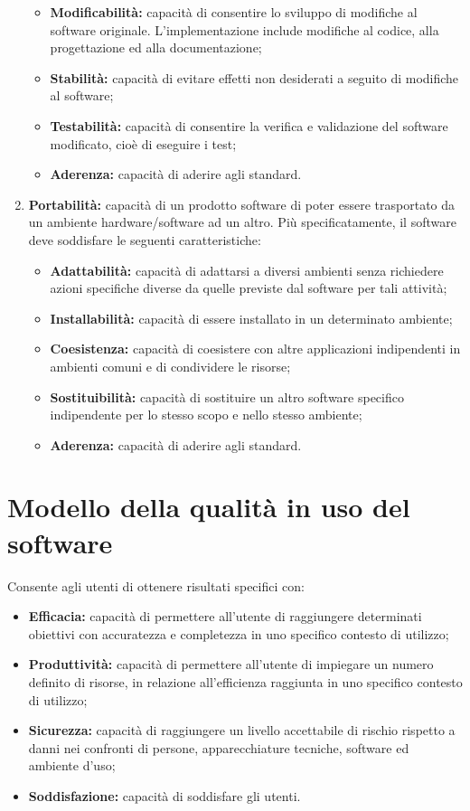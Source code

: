 \begin{enumerate}
\begin{itemize}
 		\item \textbf{Modificabilità:} capacità di consentire lo sviluppo di modifiche al software originale. L’implementazione include modifiche al codice, alla progettazione ed alla documentazione;
 		\item \textbf{Stabilità:} capacità di evitare effetti non desiderati a seguito di modifiche al software;
 		\item \textbf{Testabilità:} capacità di consentire la verifica e validazione del software modificato, cioè di eseguire i test;
 		\item \textbf{Aderenza:} capacità di aderire agli standard.
 	\end{itemize}
	\item \textbf{Portabilità:} capacità di un prodotto software di poter essere trasportato da un ambiente hardware/software ad un altro. Più specificatamente, il software deve soddisfare le seguenti caratteristiche:
	\begin{itemize}
		\item \textbf{Adattabilità:} capacità di adattarsi a diversi ambienti senza richiedere azioni specifiche diverse da quelle previste dal software per tali attività;
		\item \textbf{Installabilità:} capacità di essere installato in un determinato ambiente;
		\item \textbf{Coesistenza:} capacità di coesistere con altre applicazioni indipendenti in ambienti comuni e di condividere le risorse;
		\item \textbf{Sostituibilità:} capacità di sostituire un altro software specifico indipendente per lo stesso scopo e nello stesso ambiente;
		\item \textbf{Aderenza:} capacità di aderire agli standard.
	\end{itemize}
\end{enumerate}

\section{Modello della qualità in uso del software}\label{StandardISO/IEC9126ModelloDellaQualitàInUsoDelSoftware}
Consente agli utenti di ottenere risultati specifici con:
\begin{itemize}
	\item \textbf{Efficacia:} capacità di permettere all'utente di raggiungere determinati obiettivi con accuratezza e completezza in uno specifico contesto di utilizzo;
	\item \textbf{Produttività:} capacità di permettere all'utente di impiegare un numero definito di risorse, in relazione all'efficienza raggiunta in uno specifico contesto di utilizzo;
	\item \textbf{Sicurezza:} capacità di raggiungere un livello accettabile di rischio rispetto a danni nei confronti di persone, apparecchiature tecniche, software ed ambiente d’uso;
	\item \textbf{Soddisfazione:} capacità di soddisfare gli utenti.
\end{itemize}